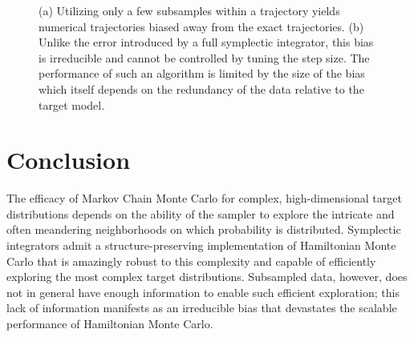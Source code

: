 \documentclass{article}
\begin{document}
\begin{figure}
\centering
{}
\caption{(a) Utilizing only a few subsamples within a trajectory yields numerical 
trajectories biased away from the exact trajectories.  (b) Unlike the error introduced 
by a full symplectic integrator, this bias is irreducible and cannot be controlled
by tuning the step size.  The performance of such an algorithm is limited by 
the size of the bias which itself depends on the redundancy of the data relative
to the target model.}
\label{fig:subsample_trajectory}
\end{figure}

\section{Conclusion}

The efficacy of Markov Chain Monte Carlo for complex, high-dimensional 
target distributions depends on the ability of the sampler to explore the intricate 
and often meandering neighborhoods on which probability is distributed.
Symplectic integrators admit a structure-preserving implementation of
Hamiltonian Monte Carlo that is amazingly robust to this complexity
and capable of efficiently exploring the most complex target distributions.
Subsampled data, however, does not in general have enough information 
to enable such efficient exploration; this lack of information manifests as
an irreducible bias that devastates the scalable performance of Hamiltonian 
Monte Carlo.
\end{document}
